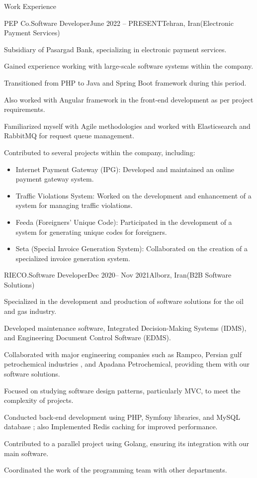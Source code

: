 \documentclass[]{kyvernitis-resume}
\begin{document}
\begin{section}{Work Experience}
    \begin{subsection}{PEP Co.}{Software Developer}{June 2022 -- PRESENT}{Tehran, Iran}{(Electronic Payment Services)}

     		\item Subsidiary of Pasargad Bank, specializing in electronic payment services.
		\item Gained experience working with large-scale software systems within the company.
		\item Transitioned from PHP to Java and Spring Boot framework during this period.
		\item Also worked with Angular framework in the front-end development as per project requirements.
		\item Familiarized myself with Agile methodologies and worked with Elasticsearch and RabbitMQ for request queue management.
		\item Contributed to several projects within the company, including:
		
		\begin{itemize}[label={}, leftmargin=1cm]
		  \item Internet Payment Gateway (IPG): Developed and maintained an online payment gateway system.
		  \item Traffic Violations System: Worked on the development and enhancement of a system for managing traffic violations.
		  \item Feeda (Foreigners' Unique Code): Participated in the development of a system for generating unique codes for foreigners.
		  \item Seta (Special Invoice Generation System): Collaborated on the creation of a specialized invoice generation system.
		\end{itemize}

    \end{subsection}

 \begin{subsection}{RIECO.}{Software Developer}{Dec 2020-- Nov 2021}{Alborz, Iran}{(B2B Software Solutions)}
       	\item Specialized in the development and production of software solutions for the oil and gas industry.
	\item Developed maintenance software, Integrated Decision-Making Systems (IDMS), and Engineering Document Control Software (EDMS).
	\item Collaborated with major engineering companies such as Rampco, Persian gulf petrochemical industries , and Apadana Petrochemical, providing them with our software solutions.
	\item Focused on studying software design patterns, particularly MVC, to meet the complexity of projects.
	\item Conducted back-end development using PHP, Symfony libraries, and MySQL database ; also Implemented Redis caching for improved performance.
	\item Contributed to a parallel project using Golang, ensuring its integration with our main software.
	\item Coordinated the work of the programming team with other departments.


\end{subsection}
\end{section}
\end{document}

